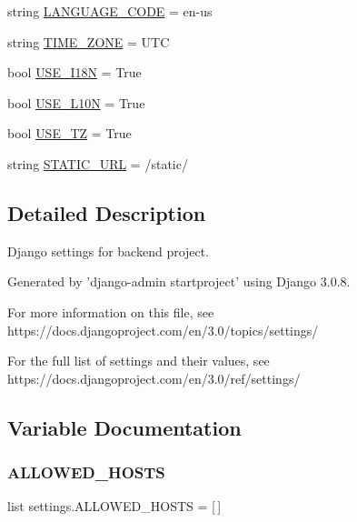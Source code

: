 \begin{DoxyCompactItemize}
string \hyperlink{namespacesettings_aa9ff7f0ab5306c06ce415aec41c11e77}{L\+A\+N\+G\+U\+A\+G\+E\+\_\+\+C\+O\+DE} = \textquotesingle{}en-\/us\textquotesingle{}
\item 
string \hyperlink{namespacesettings_a3179a25adef9f828e832d782a072b662}{T\+I\+M\+E\+\_\+\+Z\+O\+NE} = \textquotesingle{}U\+TC\textquotesingle{}
\item 
bool \hyperlink{namespacesettings_a23d7d770387f7908c1a0db0c15f4b007}{U\+S\+E\+\_\+\+I18N} = True
\item 
bool \hyperlink{namespacesettings_a66fcdb0f0997f65c615dcdb75e669382}{U\+S\+E\+\_\+\+L10N} = True
\item 
bool \hyperlink{namespacesettings_a7b8ec0c7c45e8d0ad3d4ff14b582cf04}{U\+S\+E\+\_\+\+TZ} = True
\item 
string \hyperlink{namespacesettings_a24fead837ac9daa5070672c6d5137988}{S\+T\+A\+T\+I\+C\+\_\+\+U\+RL} = \textquotesingle{}/static/\textquotesingle{}
\end{DoxyCompactItemize}


\subsection{Detailed Description}
\begin{DoxyVerb}Django settings for backend project.

Generated by 'django-admin startproject' using Django 3.0.8.

For more information on this file, see
https://docs.djangoproject.com/en/3.0/topics/settings/

For the full list of settings and their values, see
https://docs.djangoproject.com/en/3.0/ref/settings/
\end{DoxyVerb}
 

\subsection{Variable Documentation}
\mbox{\label{namespacesettings_a4bccfc67b90a7d83dfa7a459687f9ddf}} 
\subsubsection{\texorpdfstring{A\+L\+L\+O\+W\+E\+D\+\_\+\+H\+O\+S\+TS}{ALLOWED\_HOSTS}}
{\footnotesize\ttfamily list settings.\+A\+L\+L\+O\+W\+E\+D\+\_\+\+H\+O\+S\+TS = \mbox{[}$\,$\mbox{]}}

